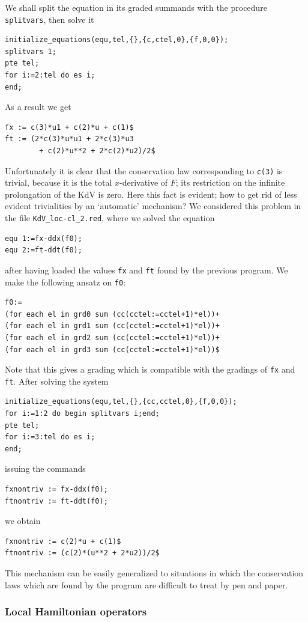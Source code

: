 We shall split the equation in its graded summands with the procedure
\texttt{splitvars}, then solve it
\begin{verbatim}
initialize_equations(equ,tel,{},{c,ctel,0},{f,0,0});
splitvars 1;
pte tel;
for i:=2:tel do es i;
end;
\end{verbatim}
As a result we get
\begin{verbatim}
fx := c(3)*u1 + c(2)*u + c(1)$
ft := (2*c(3)*u*u1 + 2*c(3)*u3
        + c(2)*u**2 + 2*c(2)*u2)/2$
\end{verbatim}
Unfortunately it is clear that the conservation law corresponding to
\texttt{c(3)} is trivial, because it is the total $x$-derivative of $F$; its
restriction on the infinite prolongation of the KdV is zero. Here this fact is
evident; how to get rid of less evident trivialities by an `automatic'
mechanism? We considered this problem in the file \texttt{KdV\_loc-cl\_2.red},
where we solved the equation
\begin{verbatim}
equ 1:=fx-ddx(f0);
equ 2:=ft-ddt(f0);
\end{verbatim}
after having loaded the values \texttt{fx} and \texttt{ft} found by the
previous program. We make the following ansatz on \texttt{f0}:
\begin{verbatim}
f0:=
(for each el in grd0 sum (cc(cctel:=cctel+1)*el))+
(for each el in grd1 sum (cc(cctel:=cctel+1)*el))+
(for each el in grd2 sum (cc(cctel:=cctel+1)*el))+
(for each el in grd3 sum (cc(cctel:=cctel+1)*el))$
\end{verbatim}
Note that this gives a grading which is compatible with the gradings of
\texttt{fx} and \texttt{ft}. After solving the system
\begin{verbatim}
initialize_equations(equ,tel,{},{cc,cctel,0},{f,0,0});
for i:=1:2 do begin splitvars i;end;
pte tel;
for i:=3:tel do es i;
end;
\end{verbatim}
issuing the commands
\begin{verbatim}
fxnontriv := fx-ddx(f0);
ftnontriv := ft-ddt(f0);
\end{verbatim}
we obtain
\begin{verbatim}
fxnontriv := c(2)*u + c(1)$
ftnontriv := (c(2)*(u**2 + 2*u2))/2$
\end{verbatim}
This mechanism can be easily generalized to situations in which the
conservation laws which are found by the program are difficult to treat by pen
and paper.


\subsubsection{Local Hamiltonian operators}
\label{sec:local-hamilt-oper}

